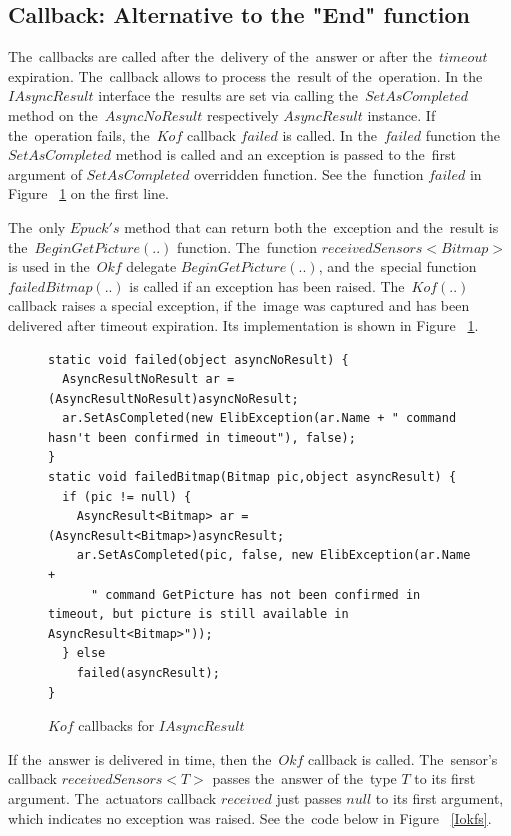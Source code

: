   \subsection{Callback: Alternative to the "End" function} 
  The~callbacks are called after the~delivery of the~answer or after the~$timeout$ expiration.
  The~callback allows to process the~result of the~operation.
  In the~$IAsyncResult$ interface the~results are set via calling the~$SetAsCompleted$ method 
  on the~$AsyncNoResult$ respectively $AsyncResult$ instance.
  If the~operation fails, the~$Kof$ callback $failed$ is called. 
  In the~$failed$ function the~$SetAsCompleted$ method is called 
  and an exception is passed to the~first argument of $SetAsCompleted$ overridden function.
  See the~function $failed$ in Figure ~\ref{Ikofs} on the first line.

  The~only $Epuck's$ method that can return both the~exception and the~result is the~$BeginGetPicture(..)$ function.
  The~function $receivedSensors<Bitmap>$ is used in the~$Okf$ delegate $BeginGetPicture(..)$, and 
  the~special function $failedBitmap(..)$ is called if an exception has been raised.
  The~$Kof(..)$ callback raises a special exception, if the~image was captured and has been 
  delivered after timeout expiration.
  Its implementation is shown in Figure ~\ref{Ikofs}. 

  
\begin{figure}[!hbp]
\begin{lstlisting}
static void failed(object asyncNoResult) {
  AsyncResultNoResult ar = (AsyncResultNoResult)asyncNoResult;
  ar.SetAsCompleted(new ElibException(ar.Name + " command hasn't been confirmed in timeout"), false); 
}
static void failedBitmap(Bitmap pic,object asyncResult) {
  if (pic != null) {
    AsyncResult<Bitmap> ar = (AsyncResult<Bitmap>)asyncResult;        
    ar.SetAsCompleted(pic, false, new ElibException(ar.Name + 
      " command GetPicture has not been confirmed in timeout, but picture is still available in AsyncResult<Bitmap>"));
  } else
    failed(asyncResult);
}
\end{lstlisting}	
\caption{$Kof$ callbacks for $IAsyncResult$} \label{Ikofs}
\end{figure}


  If the~answer is delivered in time, then the~$Okf$ callback is called.
  The~sensor's callback $receivedSensors<T>$ passes the~answer of the~type $T$ to its first argument.
  The~actuators callback $received$ just passes $null$ to its first argument, which indicates
  no exception was raised.
  See the~code below in Figure ~\ref{Iokfs}.


